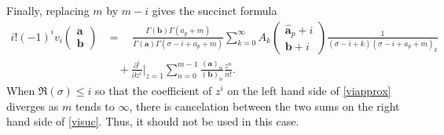 \documentclass[10pt]{article}
\numberwithin{equation}{section}
\newcommand{\ARG}[2] {\left( \begin{array}{c} #1 \\ #2 \end{array} \right)}
\begin{document}
Finally, replacing $m$ by $m-i$ gives the succinct formula
\begin{equation}
\label{visuc}
\begin{aligned}
i! (-1)^i v_i \ARG{\mathbf{a}}{\mathbf{b}} &= \quad\frac{\Gamma(\mathbf{b}) \Gamma(a_p+m)}{\Gamma(\mathbf{a}) \Gamma(\sigma-i+a_p+m)} \sum_{k=0}^{\infty} A_k \ARG{\hat{\mathbf{a}}_p+i}{\mathbf{b}+i} \frac{1}{(\sigma-i+k) (\sigma-i+a_p+m)_k}\\
&\quad +\frac{\partial^i}{\partial z^i} \Big|_{z=1} \sum_{n=0}^{m-1}{\frac{(\mathbf{a})_{n}}{(\mathbf{b})_{n}} \frac{z^n}{n!}}\text{.}
\end{aligned}
\end{equation}
When $\Re(\sigma) \le i$ so that the coefficient of $z^i$ on the left hand side of \eqref{viapprox} diverges as $m$ tends to $\infty$, there is cancelation between the two sums on the right hand side of \eqref{visuc}. Thus, it should not be used in this case.
\end{document}
